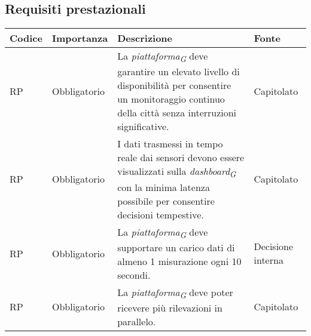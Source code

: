 \subsection{Requisiti prestazionali}
\setcounter{rowcounter}{0}
\begin{longtable}{|C{1.5cm}|C{2cm}|L{5cm}|C{2cm}|}
    \hline
    \textbf{Codice} & \textbf{Importanza} & \textbf{Descrizione} & \textbf{Fonte}  \\

    \hline
     RP & Obbligatorio & La \textit{piattaforma}\textsubscript{\textit{G}} deve garantire un elevato livello di disponibilità per consentire un monitoraggio continuo della città senza interruzioni significative.& Capitolato \\ 

    \hline
     RP & Obbligatorio & I dati trasmessi in tempo reale dai sensori devono essere visualizzati sulla \textit{dashboard}\textsubscript{\textit{G}} con la minima latenza possibile per consentire decisioni tempestive.& Capitolato \\

    \hline
     RP & Obbligatorio & La \textit{piattaforma}\textsubscript{\textit{G}} deve supportare un carico dati di almeno 1 misurazione ogni 10 secondi.& Decisione interna \\

    \hline
     RP & Obbligatorio & La \textit{piattaforma}\textsubscript{\textit{G}} deve poter ricevere più rilevazioni in parallelo.& Capitolato \\

    \hline
\end{longtable}
